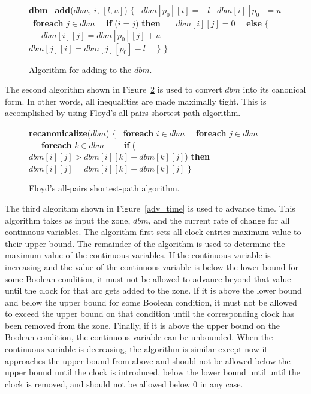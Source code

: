 \documentclass[11pt,times]{article}
\begin{document}
\begin{figure}[htbp]
\begin{algorithm}
\small {\bf{dbm\_add}}($dbm$, $i$, $[l, u]$) $\{$
\ $dbm[p_0][i] = -l$
\ $dbm[i][p_0] = u$
\ {\bf{foreach}} $j \in dbm$
\ \ {\bf{if}} ($i = j$) {\bf{then}}
\ \ \ $dbm[i][j] = 0$
\ \ {\bf{else}} $\{$
\ \ \ $dbm[i][j] = dbm[p_0][j] + u$
\ \ \ $dbm[j][i] = dbm[j][p_0] - l$
\ \ $\}$
$\}$
\end{algorithm}
\caption{\label{dbm_add}Algorithm for adding to the $dbm$.}
\end{figure}

The second algorithm shown in Figure~\ref{recon} is used to convert $dbm$ into
its canonical form.  In other words, all inequalities are made maximally tight.
This is accomplished by using Floyd's all-pairs shortest-path algorithm.

\begin{figure}[htbp]
\begin{algorithm}
\small {\bf{recanonicalize}}($dbm$) $\{$
\ {\bf{foreach}} $i \in dbm$
\ \ {\bf{foreach}} $j \in dbm$
\ \ \ {\bf{foreach}} $k \in dbm$
\ \ \ \ {\bf{if}} ($dbm[i][j] > dbm[i][k] + dbm[k][j]$) {\bf{then}}
\ \ \ \ \ $dbm[i][j] = dbm[i][k] + dbm[k][j]$
$\}$
\end{algorithm}
\caption{\label{recon}Floyd's all-pairs shortest-path algorithm.}
\end{figure}

The third algorithm shown in Figure~\ref{adv_time} is used to advance time.
This algorithm takes as input the zone, $dbm$, and the current rate of change
for all continuous variables.  The algorithm first sets all clock entries 
maximum value to their upper bound.  The remainder of the algorithm is used
to determine the maximum value of the continuous variables.
If the continuous variable is increasing and the value of the continuous 
variable is below the lower bound for some Boolean condition, it must not
be allowed to advance beyond that value until the clock for that arc gets 
added to the zone.  If it is above the lower bound and below the upper bound 
for some Boolean condition, it must not be allowed to exceed the upper bound on
that condition until the corresponding clock has been removed from the zone.
Finally, if it is above the upper bound on the Boolean condition, the 
continuous variable can be unbounded.  When the continuous variable is 
decreasing, the algorithm is similar except now it approaches the upper bound 
from above and should not be allowed below the upper bound until the clock is 
introduced, below the lower bound until until the clock is removed, and should 
not be allowed below 0 in any case.
\end{document}
